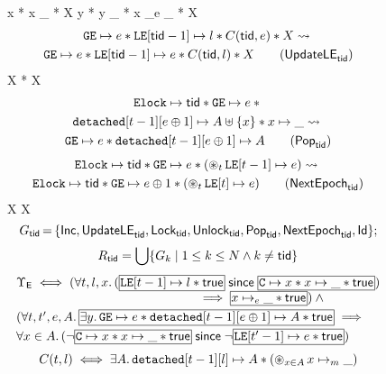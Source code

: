 
\begin{figure}
{\figfontsize
\be
\cc \mapsto x * x \mapsto \_  * X
\leadsto 
\cc \mapsto y * y \mapsto \_ * x \mapsto_e \_ * X
\ee
\begin{multline}
\GE \mapsto e * \LE[\ltid-1] \mapsto l * C(\ltid, e) * X
\leadsto {}\\
\GE \mapsto e * \LE[\ltid-1] \mapsto e * C(\ltid, l) * X
\tag{$\textsf{UpdateLE}_\ltid$}
\end{multline}
\be
\Elock {} \leadsto \Elock \mapsto \ltid * X
\ee
\be
\Elock \mapsto \ltid \leadsto \Elock {} * X
\ee
\begin{multline}
\Elock \mapsto \ltid * 
\GE \mapsto e * {}\\
\rlist[t-1][e \oplus 1] \mapsto A \uplus \{x\} * x \mapsto \_
\leadsto{}\\
\GE \mapsto e*
\rlist[t-1][e \oplus 1] \mapsto A
\tag{$\textsf{Pop}_\ltid$}
\end{multline}
\begin{multline}
\Elock \mapsto \ltid * 
\GE \mapsto e * (\bigast\nolimits_t \LE[t-1] \mapsto e)
\leadsto{}\\
\Elock \mapsto \ltid * 
\GE \mapsto e\oplus1 * (\bigast\nolimits_t \LE[t] \mapsto e)
\tag{$\textsf{NextEpoch}_\ltid$}
\end{multline}
\be
X
\leadsto
X
\ee
$$
G_{\sf tid} \,{=}\, \{\textsf{Inc}, \textsf{UpdateLE}_{\sf tid}, \textsf{Lock}_{\sf tid}, 
\textsf{Unlock}_{\sf tid}, \textsf{Pop}_{\sf tid}, \textsf{NextEpoch}_{\sf tid}, 
\textsf{Id}\};
$$
$$
R_{\sf tid} = \bigcup \{G_k \mid {1 \le k \le N} \wedge {k \not= {\sf tid}}\}
$$
$$
\begin{array}{@{}l@{}}
\Upsilon_{\sf E} \iff
(\forall t, l, x.\, (\shared{\LE[t-1] \mapsto l * \true} \since \shared{\cc \mapsto x
  * x \mapsto \_ * \true}) 
\\
\hspace{5cm} {} \implies \shared{x \mapsto_e \_* \true})
\wedge{}
\\[3pt]
(\forall t, t', e, A.\,
\shared{\exists y.\, \GE \mapsto e * 
\rlist[t-1][e \oplus 1] \mapsto A * \true} \implies {}
\\[3pt]
\forall x \in A.\, 
(\neg \shared{\cc \mapsto x * x \mapsto \_ * \true} \since 
\neg \shared{\LE[t'-1] \mapsto e * \true})
\end{array}
$$
$$
C(t, l)  \iff \exists A.\, \texttt{detached}[t-1][l] \mapsto A * (\mathop{\circledast}\limits\nolimits_{x \in A}   x \mapsto_m \_)
$$}
\end{figure}
